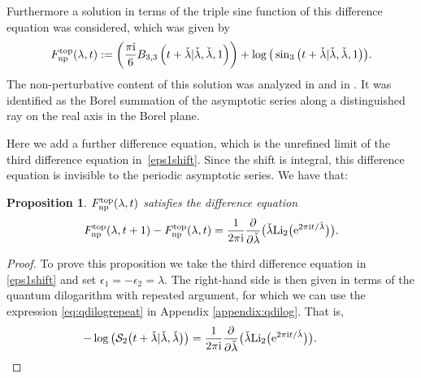 \documentclass[pdftex]{sigma}
\numberwithin{equation}{section}
\newtheorem{Proposition}[Theorem]{Proposition}
 { \theoremstyle{definition}
\newtheorem{Definition}[Theorem]{Definition}
\newtheorem{Note}[Theorem]{Note}
\newtheorem{Example}[Theorem]{Example}
\newtheorem{Remark}[Theorem]{Remark} }
\begin{document}
Furthermore a solution in terms of the triple sine function of this difference equation was considered, which was given by \cite{Alim:2021lld}
\begin{gather*}%
F^{\rm top}_{{\rm np}}(\lambda,t) := \left(\frac{\pi \mathrm{i}}{6} B_{3,3}\left(t+\check\lambda | \check{\lambda},\check{\lambda},1 \right)\right) + \log\big(\sin_3\big(t+\check{\lambda} | \check{\lambda},\check{\lambda},1\big)\big).
\end{gather*}
The non-perturbative content of this solution was analyzed in \cite{Alim:2021ukq} and in \cite{ASTT21}. It was identified as the Borel summation of the asymptotic series along a distinguished ray on the real axis in the Borel plane.

Here we add a further difference equation, which is the unrefined limit of the third difference equation in~\eqref{eps1shift}. Since the shift is integral, this difference equation is invisible to the periodic asymptotic series. We have that:

\begin{Proposition}
$F^{\rm top}_{{\rm np}}(\lambda,t)$ satisfies the difference equation
\begin{gather}\label{eq:intshifttopstring}
 F_{{\rm np}}^{\rm top}(\lambda,t+1)-F_{{\rm np}}^{\rm top}(\lambda,t)=\frac{1}{2\pi \mathrm{i}} \frac{\partial}{\partial \check{\lambda}} \big( \check{\lambda} {\rm Li}_2\big({\rm e}^{2\pi \mathrm{i} t/\check{\lambda}}\big)\big).
\end{gather}
\end{Proposition}

\begin{proof}
To prove this proposition we take the third difference equation in \eqref{eps1shift} and set $\epsilon_1=-\epsilon_2=\lambda$. The right-hand side is then given in terms of the quantum dilogarithm with repeated argument, for which we can use the expression \eqref{eq:qdilogrepeat} in Appendix \ref{appendix:qdilog}. That is,
\begin{equation*}
 - \log\big( \mathcal{S}_2\big(t+\check{\lambda} | \check{\lambda}, \check{\lambda} \big) \big)= \frac{1}{2\pi \mathrm{i}} \frac{\partial}{\partial \check{\lambda}} \big( \check{\lambda} {\rm Li}_2\big({\rm e}^{2\pi \mathrm{i} t/\check{\lambda}}\big)\big).\tag*{\qed}
\end{equation*}\renewcommand{\qed}{}
\end{proof}
\end{document}

